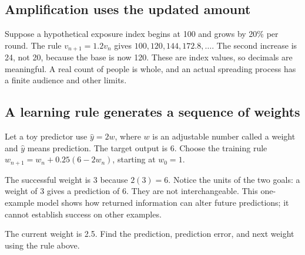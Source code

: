 \documentclass[11pt,letterpaper]{article}
\begin{document}
\subsection*{Amplification uses the updated amount}

Suppose a hypothetical exposure index begins at 100 and grows by 20\% per round. The rule \(v_{n+1}=1.2v_n\) gives \(100,120,144,172.8,\ldots\). The second increase is 24, not 20, because the base is now 120. These are index values, so decimals are meaningful. A real count of people is whole, and an actual spreading process has a finite audience and other limits.


\subsection*{A learning rule generates a sequence of weights}

Let a toy predictor use \(\widehat y=2w\), where \(w\) is an adjustable number called a weight and \(\widehat y\) means prediction. The target output is 6. Choose the training rule \(w_{n+1}=w_n+0.25(6-2w_n)\), starting at \(w_0=1\).


\par{}\par\medskip

The successful weight is 3 because \(2(3)=6\). Notice the units of the two goals: a weight of 3 gives a prediction of 6. They are not interchangeable. This one-example model shows how returned information can alter future predictions; it cannot establish success on other examples.


\begin{tcolorbox}[title={Pause and try 8},breakable]
The current weight is 2.5. Find the prediction, prediction error, and next weight using the rule above.
\end{tcolorbox}
\end{document}
